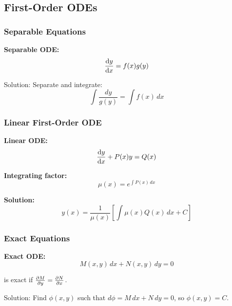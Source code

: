 \documentclass[12pt,a4paper]{article}
\begin{document}
\subsection{First-Order ODEs}
\subsubsection{Separable Equations}
\begin{formulabox}
\textbf{Separable ODE:}
\begin{equation}
\dv{y}{x} = f(x)g(y)
\end{equation}

Solution: Separate and integrate:
\begin{equation}
\int \frac{dy}{g(y)} = \int f(x) \, dx
\end{equation}
\end{formulabox}

\subsubsection{Linear First-Order ODE}
\begin{formulabox}
\textbf{Linear ODE:}
\begin{equation}
\dv{y}{x} + P(x)y = Q(x)
\end{equation}

\textbf{Integrating factor:}
\begin{equation}
\mu(x) = e^{\int P(x) \, dx}
\end{equation}

\textbf{Solution:}
\begin{equation}
y(x) = \frac{1}{\mu(x)}\left[\int \mu(x)Q(x) \, dx + C\right]
\end{equation}
\end{formulabox}

\subsubsection{Exact Equations}
\begin{formulabox}
\textbf{Exact ODE:}
\begin{equation}
M(x,y) \, dx + N(x,y) \, dy = 0
\end{equation}

is exact if $\pdv{M}{y} = \pdv{N}{x}$.

Solution: Find $\phi(x,y)$ such that $d\phi = M \, dx + N \, dy = 0$, so $\phi(x,y) = C$.
\end{formulabox}
\end{document}
